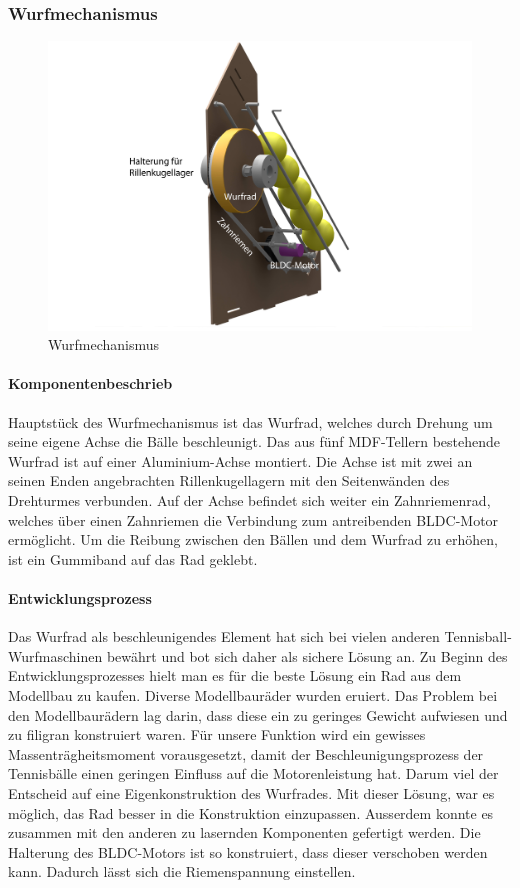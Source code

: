 \subsubsection{Wurfmechanismus}
\begin{figure}[h!]
	\centering
	\includegraphics[width=\linewidth]{../../fig/Render-Wurfmechanismusx}
	\caption{Wurfmechanismus}
	\label{fig:Wurfmechanismus}
\end{figure}
\paragraph{Komponentenbeschrieb}
Hauptstück des Wurfmechanismus ist das Wurfrad, welches durch Drehung um seine eigene Achse die Bälle beschleunigt.
Das aus fünf MDF-Tellern bestehende Wurfrad ist auf einer  Aluminium-Achse montiert. Die Achse ist mit zwei an seinen Enden angebrachten Rillenkugellagern mit den Seitenwänden des Drehturmes verbunden. Auf der Achse befindet sich weiter ein Zahnriemenrad, welches über einen Zahnriemen die Verbindung zum antreibenden BLDC-Motor ermöglicht.
Um die Reibung zwischen den Bällen und dem Wurfrad zu erhöhen, ist ein Gummiband auf das Rad geklebt.

\paragraph{Entwicklungsprozess}
Das Wurfrad als beschleunigendes Element hat sich bei vielen anderen Tennisball-Wurfmaschinen bewährt und bot sich daher als sichere Lösung an.
Zu Beginn des Entwicklungsprozesses hielt man es für die beste Lösung ein Rad aus dem Modellbau zu kaufen. Diverse Modellbauräder wurden eruiert. Das Problem bei den Modellbaurädern lag darin, dass diese ein zu geringes Gewicht aufwiesen und zu filigran konstruiert waren. Für unsere Funktion wird ein gewisses Massenträgheitsmoment vorausgesetzt, damit der Beschleunigungsprozess der Tennisbälle einen geringen Einfluss auf die Motorenleistung hat. Darum viel der Entscheid auf eine Eigenkonstruktion des Wurfrades. Mit dieser Lösung, war es möglich, das Rad besser in die Konstruktion einzupassen. Ausserdem konnte es zusammen mit den anderen zu lasernden Komponenten gefertigt werden. Die Halterung des BLDC-Motors ist so konstruiert, dass dieser verschoben werden kann. Dadurch lässt sich die Riemenspannung einstellen.   